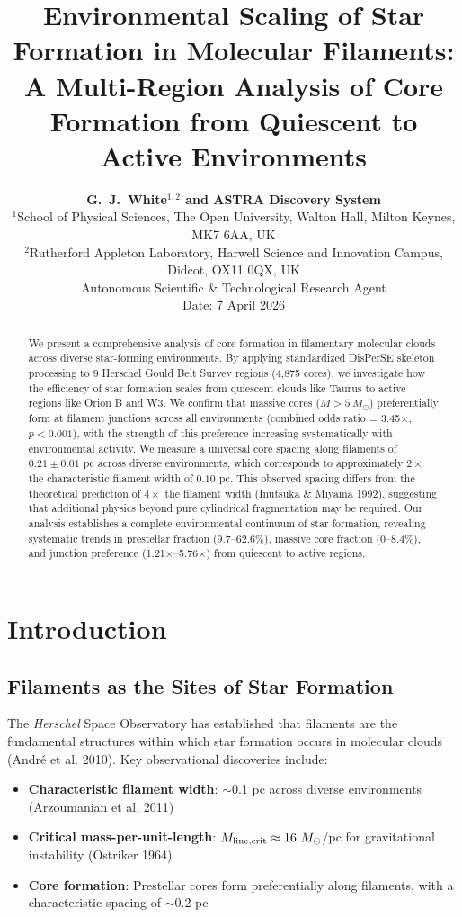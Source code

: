 \documentclass[11pt,a4paper]{article}
\title{\textbf{\Large Environmental Scaling of Star Formation in Molecular Filaments:\\
\large{A Multi-Region Analysis of Core Formation from Quiescent to Active Environments}}}
\author{\textbf{G.~J.~White$^{1,2}$ and ASTRA Discovery System}\\
\small{$^{1}$School of Physical Sciences, The Open University, Walton Hall, Milton Keynes, MK7 6AA, UK}\\
\small{$^{2}$Rutherford Appleton Laboratory, Harwell Science and Innovation Campus, Didcot, OX11 0QX, UK}\\
\small{Autonomous Scientific \& Technological Research Agent}\\
\small{Date: 7 April 2026}}
\begin{document}
\maketitle

\begin{abstract}
We present a comprehensive analysis of core formation in filamentary molecular clouds across diverse star-forming environments. By applying standardized DisPerSE skeleton processing to 9 Herschel Gould Belt Survey regions (4,875 cores), we investigate how the efficiency of star formation scales from quiescent clouds like Taurus to active regions like Orion B and W3. We confirm that massive cores ($M > 5~M_\odot$) preferentially form at filament junctions across all environments (combined odds ratio = 3.45$\times$, $p < 0.001$), with the strength of this preference increasing systematically with environmental activity. We measure a universal core spacing along filaments of $0.21 \pm 0.01$ pc across diverse environments, which corresponds to approximately $2\times$ the characteristic filament width of $0.10$ pc. This observed spacing differs from the theoretical prediction of $4\times$ the filament width (Inutsuka \& Miyama 1992), suggesting that additional physics beyond pure cylindrical fragmentation may be required. Our analysis establishes a complete environmental continuum of star formation, revealing systematic trends in prestellar fraction (9.7--62.6\%), massive core fraction (0--8.4\%), and junction preference (1.21$\times$--5.76$\times$) from quiescent to active regions.
\end{abstract}

\tableofcontents

\section{Introduction}

\subsection{Filaments as the Sites of Star Formation}

The \textit{Herschel} Space Observatory has established that filaments are the fundamental structures within which star formation occurs in molecular clouds (Andr\'e et al. 2010). Key observational discoveries include:

\begin{itemize}
    \item \textbf{Characteristic filament width}: $\sim$0.1 pc across diverse environments (Arzoumanian et al. 2011)
    \item \textbf{Critical mass-per-unit-length}: $M_{\rm line,crit} \approx 16~M_\odot$/pc for gravitational instability (Ostriker 1964)
    \item \textbf{Core formation}: Prestellar cores form preferentially along filaments, with a characteristic spacing of $\sim$0.2 pc
\end{itemize}
\end{document}
